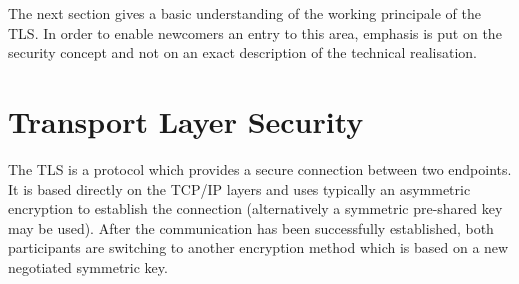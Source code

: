The next section gives a basic understanding of the working principale of the TLS. In order to enable newcomers an entry to  this area, emphasis is put on the security concept and not on an exact description of the technical realisation.




\section{Transport Layer Security}


The TLS is a protocol which provides a secure connection between two endpoints.
It is based directly on the TCP/IP layers and uses typically an asymmetric encryption to establish the connection (alternatively a symmetric pre-shared key may be used).
After the communication has been successfully established, both participants are switching to another encryption method which is based on a new negotiated symmetric key.\\
%
%


